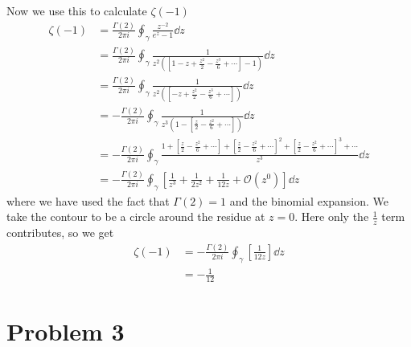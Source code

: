 \documentclass[a4paper,12pt]{article}
\begin{document}
Now we use this to calculate $\zeta(-1)$
\begin{equation}
	\begin{aligned}
				\zeta(-1)&=\frac{\Gamma(2)}{2\pi i}\oint_\gamma \frac{z^{-2}}{e^{z}-1} \dd z
				\\
				&=\frac{\Gamma(2)}{2\pi i}\oint_\gamma
				\frac{1}{z^2\left(\left[1-z+\frac{z^2}{2}-\frac{z^3}{6}+\cdots\right] -1\right)} \dd z
				\\
				&=\frac{\Gamma(2)}{2\pi i}\oint_\gamma
				\frac{1}{z^2\left(\left[-z+\frac{z^2}{2}-\frac{z^3}{6}+\cdots\right]\right)} \dd z
				\\
				&=-\frac{\Gamma(2)}{2\pi i}\oint_\gamma
				\frac{1}{z^3\left(1-\left[\frac{z}{2}-\frac{z^2}{6}+\cdots\right]\right)} \dd z
				\\
				&=-\frac{\Gamma(2)}{2\pi i}\oint_\gamma
				\frac{1+\left[\frac{z}{2}-\frac{z^2}{6}+\cdots\right]+\left[\frac{z}{2}-\frac{z^2}{6}+\cdots\right]^2+\left[\frac{z}{2}-\frac{z^2}{6}+\cdots\right]^3+\cdots}{z^3} \dd z
				\\
				&=-\frac{\Gamma(2)}{2\pi i}\oint_\gamma
			\left[	\frac{1}{z^3}+\frac{1}{2z^2}+\frac{1}{12z}+\mathcal{O}(z^0)\right] \dd z
	\end{aligned}
\end{equation}
where we have used the fact that $\Gamma(2)=1$ and the binomial expansion.
We take the contour to be a circle around the residue at $z=0$. Here only the $\frac{1}{z}$ term contributes, so we get
\begin{equation}
	\begin{aligned}
		\zeta(-1)
		&=-\frac{\Gamma(2)}{2\pi i}\oint_\gamma
		\left[\frac{1}{12z}\right] \dd z\\
		&=-\frac{1}{12}
	\end{aligned}
\end{equation}
\section*{Problem 3}
\end{document}
